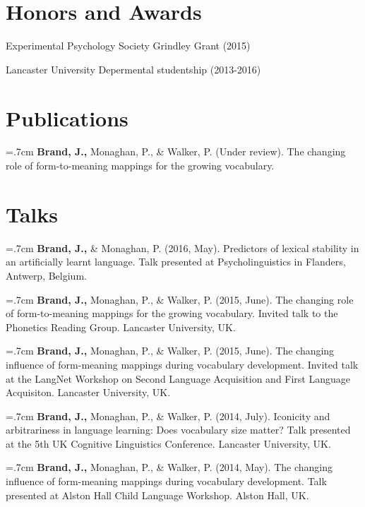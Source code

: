 \documentclass[letterpaper]{article}
\renewenvironment{itemize}{
  \begin{list}{}{
    \setlength{\leftmargin}{1.5em}
  }
}{
  \end{list}
}
\begin{document}
\section*{ Honors and Awards}
\begin{itemize}
\item Experimental Psychology Society Grindley Grant (2015)
\item Lancaster University Depermental studentship (2013-2016)
\end{itemize}

\section*{Publications}

\onehalfspacing

  \hangindent=.7cm {\bf Brand, J.,} Monaghan, P., \& Walker, P. (Under review). The changing role of form-to-meaning mappings for the growing vocabulary.

   
 \singlespacing
 
\section*{Talks}
\onehalfspacing

\hangindent=.7cm {\bf Brand, J.,} \& Monaghan, P. (2016, May). Predictors of lexical stability in an artificially learnt language. Talk presented at Psycholinguistics in Flanders, Antwerp, Belgium.

\hangindent=.7cm {\bf Brand, J.,} Monaghan, P., \& Walker, P. (2015, June). The changing role of form-to-meaning mappings for the growing vocabulary. Invited talk to the Phonetics Reading Group. Lancaster University, UK.

\hangindent=.7cm {\bf Brand, J.,} Monaghan, P., \& Walker, P. (2015, June). The changing influence of form-meaning mappings during vocabulary development. Invited talk at the LangNet Workshop on Second Language Acquisition and First Language Acquisiton. Lancaster University, UK.

\hangindent=.7cm {\bf Brand, J.,} Monaghan, P., \& Walker, P. (2014, July). Iconicity and arbitrariness in language learning: Does vocabulary size matter? Talk presented at the 5th UK Cognitive Linguistics Conference. Lancaster University, UK.

\hangindent=.7cm {\bf Brand, J.,} Monaghan, P., \& Walker, P. (2014, May). The changing influence of form-meaning mappings during vocabulary development. Talk presented at Alston Hall Child Language Workshop. Alston Hall, UK.
\end{document}

